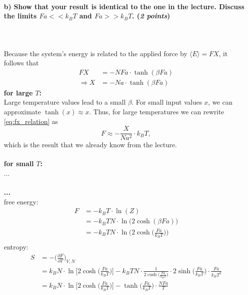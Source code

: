 \paragraph{b) Show that your result is identical to the one in the lecture.
    Discuss the limits $Fa<<k_BT$ and $Fa>>k_BT$. (\textit{2 points})
} \ \\
    \\
    Because the system's energy is related to the applied force by 
    $\langle E\rangle=FX$, it follows that 
    \begin{align}
        FX
        &=-NFa\cdot\tanh(\beta Fa) \\
        \Rightarrow X
        &=-Na\cdot\tanh(\beta Fa)
        \label{eq:fx_relation}
    \end{align}
    \textbf{for large $T$:} \\
    Large temperature values lead to a small $\beta$.
    For small input values $x$, we can approximate $\tanh(x)\approx x$.
    Thus, for large temperatures we can rewrite \autoref{eq:fx_relation} as
    \begin{equation}
        F\approx-\frac{X}{Na^2}\cdot k_BT,
    \end{equation}
    which is the result that we already know from the lecture. \\
    \\
    \textbf{for small $T$:} \\
    ... \\
    \\
    \textbf{...} \\
    free energy:
    \begin{align}
        F
        &=-k_BT\cdot\ln(Z) \\
        &=-k_BTN\cdot\ln\bigg(2\cosh(\beta Fa)\bigg) \\
        &=-k_BTN\cdot\ln\bigg(2\cosh\bigg(\frac{Fa}{k_BT}\bigg)\bigg) \\
    \end{align}
    entropy:
    \begin{align}
        S
        &=-\bigg(\frac{\partial F}{\partial T}\bigg)_{V,N} \\
        &=k_BN\cdot\ln\bigg[2\cosh\bigg(\frac{Fa}{k_BT}\bigg)\bigg]
        -k_BTN\cdot\frac{1}{2\cosh\bigg(\frac{Fa}{k_BT}\bigg)}\cdot
        2\sinh\bigg(\frac{Fa}{k_BT}\bigg)\cdot\frac{Fa}{k_BT^2} \\
        &=k_BN\cdot\ln\bigg[2\cosh\bigg(\frac{Fa}{k_BT}\bigg)\bigg]
        -\tanh\bigg(\frac{Fa}{k_BT}\bigg)\cdot\frac{NFa}{T} \\
    \end{align}

